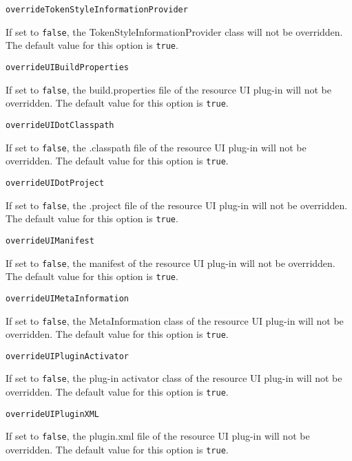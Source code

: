 \noindent\texttt{overrideTokenStyleInformationProvider}
\begin{myindentpar}{1cm}
If set to \texttt{false}, the TokenStyleInformationProvider class will not be overridden. The default value for this option is \texttt{true}.
\end{myindentpar}

\noindent\texttt{overrideUIBuildProperties}
\begin{myindentpar}{1cm}
If set to \texttt{false}, the build.properties file of the resource UI plug-in will not be overridden. The default value for this option is \texttt{true}.
\end{myindentpar}

\noindent\texttt{overrideUIDotClasspath}
\begin{myindentpar}{1cm}
If set to \texttt{false}, the .classpath file of the resource UI plug-in will not be overridden. The default value for this option is \texttt{true}.
\end{myindentpar}

\noindent\texttt{overrideUIDotProject}
\begin{myindentpar}{1cm}
If set to \texttt{false}, the .project file of the resource UI plug-in will not be overridden. The default value for this option is \texttt{true}.
\end{myindentpar}

\noindent\texttt{overrideUIManifest}
\begin{myindentpar}{1cm}
If set to \texttt{false}, the manifest of the resource UI plug-in will not be overridden. The default value for this option is \texttt{true}.
\end{myindentpar}

\noindent\texttt{overrideUIMetaInformation}
\begin{myindentpar}{1cm}
If set to \texttt{false}, the MetaInformation class of the resource UI plug-in will not be overridden. The default value for this option is \texttt{true}.
\end{myindentpar}

\noindent\texttt{overrideUIPluginActivator}
\begin{myindentpar}{1cm}
If set to \texttt{false}, the plug-in activator class of the resource UI plug-in will not be overridden. The default value for this option is \texttt{true}.
\end{myindentpar}

\noindent\texttt{overrideUIPluginXML}
\begin{myindentpar}{1cm}
If set to \texttt{false}, the plugin.xml file of the resource UI plug-in will not be overridden. The default value for this option is \texttt{true}.
\end{myindentpar}

